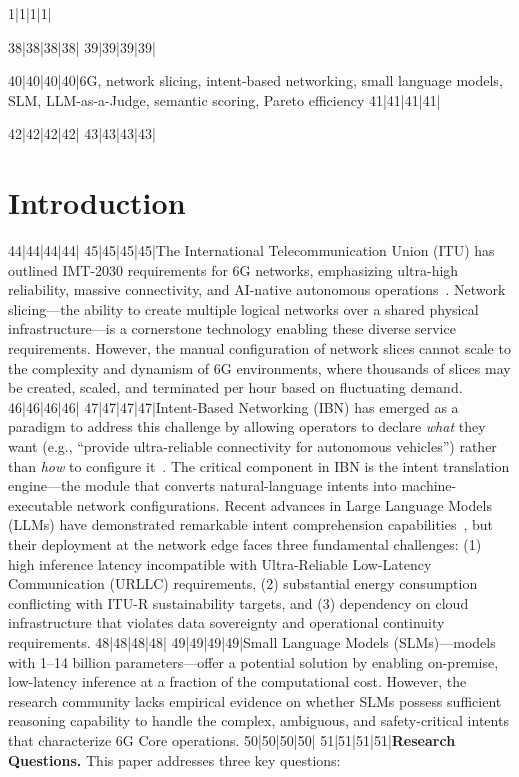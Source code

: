 1|1|1|1|\documentclass[10pt,conference]{IEEEtran}
\begin{document}
38|38|38|38|
39|39|39|39|\begin{IEEEkeywords}
40|40|40|40|6G, network slicing, intent-based networking, small language models, SLM, LLM-as-a-Judge, semantic scoring, Pareto efficiency
41|41|41|41|\end{IEEEkeywords}
42|42|42|42|
43|43|43|43|\section{Introduction}
44|44|44|44|
45|45|45|45|The International Telecommunication Union (ITU) has outlined IMT-2030 requirements for 6G networks, emphasizing ultra-high reliability, massive connectivity, and AI-native autonomous operations~\cite{itu2030}. Network slicing---the ability to create multiple logical networks over a shared physical infrastructure---is a cornerstone technology enabling these diverse service requirements. However, the manual configuration of network slices cannot scale to the complexity and dynamism of 6G environments, where thousands of slices may be created, scaled, and terminated per hour based on fluctuating demand.
46|46|46|46|
47|47|47|47|Intent-Based Networking (IBN) has emerged as a paradigm to address this challenge by allowing operators to declare \textit{what} they want (e.g., ``provide ultra-reliable connectivity for autonomous vehicles'') rather than \textit{how} to configure it~\cite{ibn_survey}. The critical component in IBN is the intent translation engine---the module that converts natural-language intents into machine-executable network configurations. Recent advances in Large Language Models (LLMs) have demonstrated remarkable intent comprehension capabilities~\cite{gpt4}, but their deployment at the network edge faces three fundamental challenges: (1) high inference latency incompatible with Ultra-Reliable Low-Latency Communication (URLLC) requirements, (2) substantial energy consumption conflicting with ITU-R sustainability targets, and (3) dependency on cloud infrastructure that violates data sovereignty and operational continuity requirements.
48|48|48|48|
49|49|49|49|Small Language Models (SLMs)---models with 1--14 billion parameters---offer a potential solution by enabling on-premise, low-latency inference at a fraction of the computational cost. However, the research community lacks empirical evidence on whether SLMs possess sufficient reasoning capability to handle the complex, ambiguous, and safety-critical intents that characterize 6G Core operations.
50|50|50|50|
51|51|51|51|\textbf{Research Questions.} This paper addresses three key questions:
\end{document}
